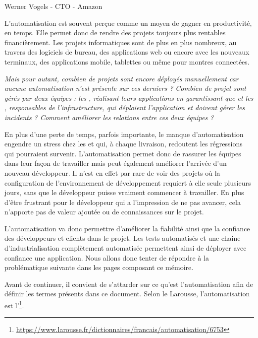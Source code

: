 \epigraph{}{Werner Vogels - \gls{CTO} - Amazon}

L'automatisation est souvent perçue comme un moyen de gagner en productivité, en temps. Elle permet donc de rendre des projets toujours plus rentables financièrement. Les projets informatiques sont de plus en plus nombreux, au travers des logiciels de bureau, des applications web ou encore avec les nouveaux terminaux, des applications mobile, tablettes ou même pour montres connectées.
	
\emph{Mais pour autant, combien de projets sont encore déployés manuellement car aucune automatisation n'est présente sur ces derniers ? Combien de projet sont gérés par deux équipes : les \frquote{\dev}, réalisant leurs applications en garantissant que  et les \frquote{\ops}, responsables de l'infrastructure, qui déploient l'application et doivent gérer les incidents ? Comment améliorer les relations entre ces deux équipes ?}
	
En plus d'une perte de temps, parfois importante, le manque d'automatisation engendre un stress chez les \dev{} et \ops{} qui, à chaque livraison, redoutent les régressions qui pourraient survenir. L'automatisation permet donc de rassurer les équipes dans leur façon de travailler mais peut également améliorer l'arrivée d'un nouveau développeur. Il n'est en effet par rare de voir des projets où la configuration de l'environnement de développement requiert à elle seule plusieurs jours, sans que le développeur puisse vraiment commencer à travailler. En plus d'être frustrant pour le développeur qui a l'impression de ne pas avancer, cela n'apporte pas de valeur ajoutée ou de connaissances sur le projet.

L'automatisation va donc permettre d'améliorer la fiabilité ainsi que la confiance des développeurs et clients dans le projet. Les tests automatisés et une chaine d'industrialisation complètement automatisée permettent ainsi de déployer avec confiance une application. Nous allons donc tenter de répondre à la problématique suivante dans les pages composant ce mémoire.

\hrulefill

{\large \problematique}

\hrulefill

Avant de continuer, il convient de s'attarder sur ce qu'est l'automatisation afin de définir les termes présents dans ce document. Selon le Larousse, l'automatisation est l'\footnote{\url{https://www.larousse.fr/dictionnaires/francais/automatisation/6753}}. 

